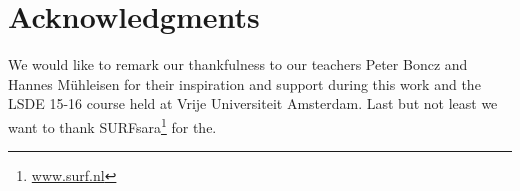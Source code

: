 \documentclass{vldb}
\begin{document}
\section{Acknowledgments}
We would like to remark our thankfulness to our teachers Peter Boncz and Hannes M{\"u}hleisen for their inspiration and support during this work and the LSDE 15-16 course held at Vrije Universiteit Amsterdam.
Last but not least we want to thank SURFsara\footnote{\url{www.surf.nl}} for the.


 

\end{document}
